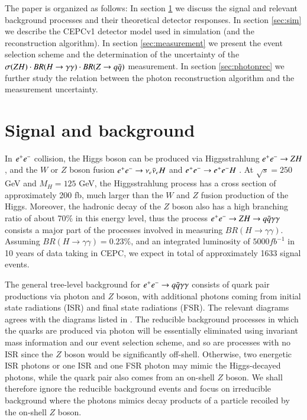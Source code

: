 \documentclass[11pt,a4paper]{cepcnote}
\newcommand{\Zqq}{Z\rightarrow q\bar q}
\newcommand{\PRZH}{\sigma(ZH)}
\newcommand{\qt}{\PRZH\cdot BR(\Hgg)\cdot BR(\Zqq)}
\begin{document}
The paper is organized as follows: In section \ref{sec:sig&bkg} we discuss the signal and relevant background processes and their theoretical detector responses. In section \ref{sec:sim} we describe the CEPCv1 detector model used in simulation (and the reconstruction algorithm). In section \ref{sec:measurement} we present the event selection scheme and the determination of the uncertainty of the $\qt$ measurement. In section \ref{sec:photonrec} we further study the relation between the photon reconstruction algorithm and the measurement uncertainty. 

\section{Signal and background}
\label{sec:sig&bkg}
In $e^+ e^-$ collision, the Higgs boson can be produced via Higgsstrahlung $e^+ e^-\rightarrow ZH$, and the $W$ or $Z$ boson fusion $e^+ e^-\rightarrow \nu_e\bar\nu_eH$ and $e^+ e^-\rightarrow e^+ e^- H$ \cite{Glashow:1961tr,Weinberg:1967tq,salam1968elementary}. At $\sqrt{s}=250$ GeV and $M_H=125$ GeV, the Higgsstrahlung process has a cross section of approximately 200 fb, much larger than the $W$ and $Z$ fusion production of the Higgs. Moreover, the hadronic decay of the $Z$ boson also has a high branching ratio of about 70\% in this energy level, thus the process $e^+ e^-\rightarrow ZH\rightarrow q\bar q\gamma\gamma$ consists a major part of the processes involved in measuring $BR(H\rightarrow\gamma\gamma)$. Assuming $BR(H\rightarrow\gamma\gamma)=0.23\%$, and an integrated luminosity of $5000fb^{-1}$ in 10 years of data taking in CEPC, we expect in total of approximately 1633 signal events.

The general tree-level background for $e^+ e^-\rightarrow q\bar q\gamma\gamma$ consists of quark pair productions via photon and $Z$ boson, with additional photons coming from initial state radiations (ISR) and final state radiations (FSR). The relevant diagrams agrees with the diagrams listed in \cite{Boos:2000bz}. The reducible background processes in which the quarks are produced via photon will be essentially eliminated using invariant mass information and our event selection scheme, and so are processes with no ISR since the $Z$ boson would be significantly off-shell. Otherwise, two energetic ISR photons or one ISR and one FSR photon may mimic the Higgs-decayed photons, while the quark pair also comes from an on-shell $Z$ boson. We shall therefore ignore the reducible background events and focus on irreducible background where the photons mimics decay products of a particle recoiled by the on-shell $Z$ boson.
\end{document}
